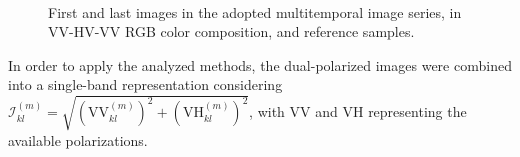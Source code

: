 \documentclass[journal]{IEEEtran}
\newcommand{\vd}{{\textbf d}}
\newcommand{\vR}{{\textbf R}}
\begin{document}
\begin{figure}[hbt]
\centering

\mbox{
}


\caption{First and last images in the adopted multitemporal image series, in VV-HV-VV RGB color composition, and reference samples.}\label{figImageRef}
\end{figure}


In order to apply the analyzed methods, the dual-polarized images were combined into a single-band representation considering
$\mathcal{I}_{kl}^{(m)} = \sqrt{(\mathrm{VV}_{kl}^{(m)})^2+(\mathrm{VH}_{kl}^{(m)})^2}$, with $\mathrm{VV}$ and $\mathrm{VH}$ representing the available polarizations.


\end{document}
